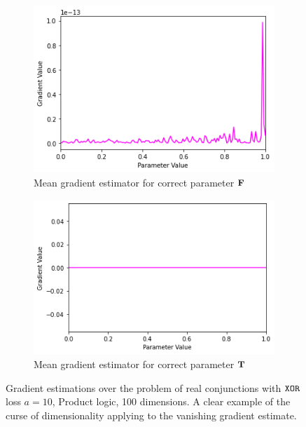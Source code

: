 \begin{figure}[h]
\begin{subfigure}[b]{0.47\textwidth}
        \includegraphics[width=\textwidth]{imgs/grad_prod_10_falseparam_100dim_avg.png}
        \caption{Mean gradient estimator for correct parameter $\textbf{F}$}
        \label{fig:conjgrad10falseavg100}
    \end{subfigure}
    \begin{subfigure}[b]{0.47\textwidth}
        \centering
        \includegraphics[width=\textwidth]{imgs/grad_prod_10_trueparam_100dim_avg.png}
        \caption{Mean gradient estimator for correct parameter $\textbf{T}$}
        \label{fig:conjgrad10trueavg100}
    \end{subfigure}
       \caption{Gradient estimations over the problem of real conjunctions with $\texttt{XOR}$ loss $a=10$, Product logic, 100 dimensions. A clear example of the curse of dimensionality applying to the vanishing gradient estimate.}
       \label{fig:conjgrad10100}
\end{figure}

